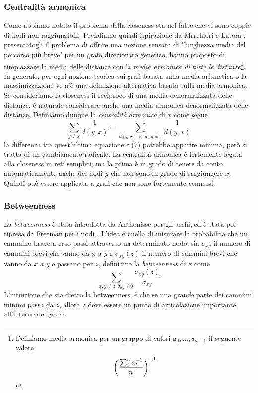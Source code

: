 \subsubsection{Centralità armonica}
Come abbiamo notato il problema della closeness sta nel fatto che vi sono coppie di nodi non raggiungibili. Prendiamo quindi ispirazione da Marchiori e Latora %
: presentatogli il problema di offrire una nozione sensata di "lunghezza media del percorso più breve" per un grafo direzionato generico, hanno proposto di rimpiazzare la media delle distanze con la \textit{media armonica di tutte le distanze}\footnote{Definiamo media armonica per un gruppo di valori $a_0, \dots, a_{n - 1}$ il seguente valore
\begin{equation*}
    \left(\frac{\sum_i^n{a_i^{-1}}}{n}\right)^{-1}
\end{equation*}
}.\\
In generale, per ogni nozione teorica sui grafi basata sulla media aritmetica o la massimizzazione ve n'è una definizione alternativa basata sulla media armonica. Se consideriamo la closeness il reciproco di una media denormalizzata delle distanze, è naturale considerare anche una media armonica denormalizzata delle distanze. Definiamo dunque la \textit{centralità armonica} di $x$ come segue
\begin{equation}
    \sum_{y \neq x}{\frac{1}{d(y, x)}} = \sum_{d(y, x) < \infty, y \neq x}{\frac{1}{d(y, x)}}
\end{equation}
la differenza tra quest'ultima equazione e (7) potrebbe apparire minima, però si tratta di un cambiamento radicale. La centralità armonica è fortemente legata alla closeness in reti semplici, ma la prima è in grado di tenere da conto automaticamente anche dei nodi $y$ che non sono in grado di raggiungere $x$. Quindi può essere applicata a grafi che non sono fortemente connessi.
\subsubsection{Betweenness}
La \textit{betweenness} è stata introdotta da Anthonisse %
per gli archi, ed è stata poi ripresa da Freeman per i nodi %
. L'idea è quella di misurare la probabilità che un cammino brave a caso passi attraverso un determinato nodo: sia $\sigma_{xy}$ il numero di cammini brevi che vanno da $x$ a $y$ e $\sigma_{xy}(z)$ il numero di cammini brevi che vanno da $x$ a $y$ e passano per $z$, definiamo la \textit{betweenness} di $x$ come
\begin{equation*}
    \sum_{x, y \neq z, \sigma_{xy} \neq 0}{\frac{\sigma_{xy}(z)}{\sigma_{xy}}}
\end{equation*}
L'intuizione che sta dietro la betweenness, è che se una grande parte dei cammini minimi passa da $z$, allora $z$ deve essere un punto di articolazione importante all'interno del grafo.
